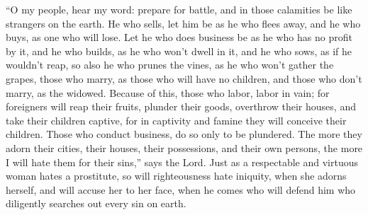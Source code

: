  ``O my people, hear my word: prepare for battle, and in
those calamities be like strangers on the earth.  He who
sells, let him be as he who flees away, and he who buys, as one who will
lose.  Let he who does business be as he who has no
profit by it, and he who builds, as he who won't dwell in it,
 and he who sows, as if he wouldn't reap, so also he who
prunes the vines, as he who won't gather the grapes, 
those who marry, as those who will have no children, and those who don't
marry, as the widowed.  Because of this, those who labor,
labor in vain;  for foreigners will reap their fruits,
plunder their goods, overthrow their houses, and take their children
captive, for in captivity and famine they will conceive their children.
 Those who conduct business, do so only to be plundered.
The more they adorn their cities, their houses, their possessions, and
their own persons,  the more I will hate them for their
sins,'' says the Lord.  Just as a respectable and
virtuous woman hates a prostitute,  so will righteousness
hate iniquity, when she adorns herself, and will accuse her to her face,
when he comes who will defend him who diligently searches out every sin
on earth.

